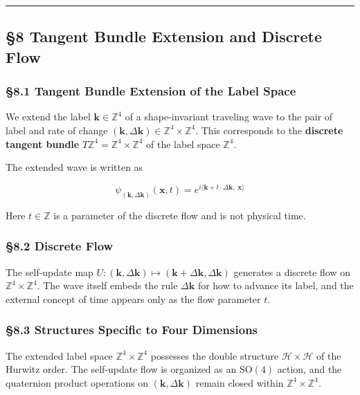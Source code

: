 \documentclass[
  a4paper,11pt]{article}
\theoremstyle{definition}
\theoremstyle{remark}
\begin{document}
\begin{center}\rule{0.5\linewidth}{0.5pt}\end{center}

\subsection{§8 Tangent Bundle Extension and Discrete
Flow}\label{tangent-bundle-extension-and-discrete-flow}

\subsubsection{§8.1 Tangent Bundle Extension of the Label
Space}\label{tangent-bundle-extension-of-the-label-space}

We extend the label \(\mathbf{k} \in \mathbb{Z}^4\) of a shape-invariant
traveling wave to the pair of label and rate of change
\((\mathbf{k}, \Delta\mathbf{k}) \in \mathbb{Z}^4 \times \mathbb{Z}^4\).
This corresponds to the \textbf{discrete tangent bundle}
\(T\mathbb{Z}^4 = \mathbb{Z}^4 \times \mathbb{Z}^4\) of the label space
\(\mathbb{Z}^4\).

The extended wave is written as

\[\psi_{(\mathbf{k}, \Delta\mathbf{k})}(\mathbf{x}, t) = e^{i\langle \mathbf{k} + t \cdot \Delta\mathbf{k},\; \mathbf{x} \rangle}\]

Here \(t \in \mathbb{Z}\) is a parameter of the discrete flow and is not
physical time.

\subsubsection{§8.2 Discrete Flow}\label{discrete-flow}

The self-update map
\(U : (\mathbf{k}, \Delta\mathbf{k}) \mapsto (\mathbf{k} + \Delta\mathbf{k}, \Delta\mathbf{k})\)
generates a discrete flow on \(\mathbb{Z}^4 \times \mathbb{Z}^4\). The
wave itself embeds the rule \(\Delta\mathbf{k}\) for how to advance its
label, and the external concept of time appears only as the flow
parameter \(t\).

\subsubsection{§8.3 Structures Specific to Four
Dimensions}\label{structures-specific-to-four-dimensions}

The extended label space \(\mathbb{Z}^4 \times \mathbb{Z}^4\) possesses
the double structure \(\mathcal{H} \times \mathcal{H}\) of the Hurwitz
order. The self-update flow is organized as an \(\mathrm{SO}(4)\)
action, and the quaternion product operations on
\((\mathbf{k}, \Delta\mathbf{k})\) remain closed within
\(\mathbb{Z}^4 \times \mathbb{Z}^4\).
\end{document}
